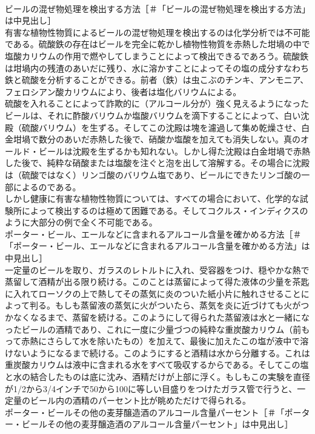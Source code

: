 \documentclass[8pt]{extreport}
\begin{document}
\begin{CJK}{UTF8}{min}
\\	ビールの混ぜ物処理を検出する方法［＃「ビールの混ぜ物処理を検出する方法」は中見出し］
\\	有害な植物性物質によるビールの混ぜ物処理を検出するのは化学分析では不可能である。硫酸鉄の存在はビールを完全に乾かし植物性物質を赤熱した坩堝の中で塩酸カリウムの作用で燃やしてしまうことによって検出できるであろう。硫酸鉄は坩堝内の残渣のあいだに残り、水に溶かすことによってその塩の成分すなわち鉄と硫酸を分析することができる。前者（鉄）は虫こぶのチンキ、アンモニア、フェロシアン酸カリウムにより、後者は塩化バリウムによる。
\\	硫酸を入れることによって詐欺的に（アルコール分が）強く見えるようになったビールは、それに酢酸バリウムか塩酸バリウムを滴下することによって、白い沈殿（硫酸バリウム）を生ずる。そしてこの沈殿は塊を濾過して集め乾燥させ、白金坩堝で数分のあいだ赤熱した後で、硝酸か塩酸を加えても消失しない。真のオールド・ビールは沈殿を生ずるかも知れない。しかし得た沈殿は白金坩堝で赤熱した後で、純粋な硝酸または塩酸を注ぐと泡を出して溶解する。その場合に沈殿は（硫酸ではなく）リンゴ酸のバリウム塩であり、ビールにできたリンゴ酸の一部によるのである。
\\	しかし健康に有害な植物性物質については、すべての場合において、化学的な試験所によって検出するのは極めて困難である。そしてコクルス・インディクスのように大部分の例で全く不可能である。
\\	ポーター・ビール、エールなどに含まれるアルコール含量を確かめる方法［＃「ポーター・ビール、エールなどに含まれるアルコール含量を確かめる方法」は中見出し］
\\	一定量のビールを取り、ガラスのレトルトに入れ、受容器をつけ、穏やかな熱で蒸留して酒精が出る限り続ける。このことは蒸留によって得た液体の少量を茶匙に入れてローソクの上で熱してその蒸気に炎のついた紙小片に触れさせることによって判る。もしも蒸留液の蒸気に火がついたら、蒸気を炎に近づけても火がつかなくなるまで、蒸留を続ける。このようにして得られた蒸留液は水と一緒になったビールの酒精であり、これに一度に少量づつの純粋な重炭酸カリウム（前もって赤熱にさらして水を除いたもの）を加えて、最後に加えたこの塩が液中で溶けないようになるまで続ける。このようにすると酒精は水から分離する。これは重炭酸カリウムは液中に含まれる水をすべて吸収するからである。そしてこの塩と水の結合したものは底に沈み、酒精だけが上部に浮く。もしもこの実験を直径が1/2から3/4インチで50から100に等しい目盛りをつけたガラス管で行うと、一定量のビール内の酒精のパーセント比が眺めただけで得られる。
\\	ポーター・ビールその他の麦芽醸造酒のアルコール含量パーセント［＃「ポーター・ビールその他の麦芽醸造酒のアルコール含量パーセント」は中見出し］

\end{CJK}
\end{document}
